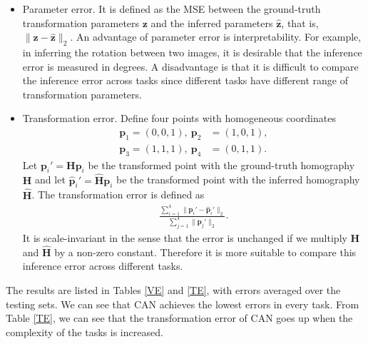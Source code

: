 \documentclass[conference]{IEEEtran}
\begin{document}
\vspace{0.1in}
\begin{itemize}
\item Parameter error. It is defined as the MSE between the ground-truth transformation parameters $\mathbf{z}$ and the inferred parameters $\widehat{\mathbf{z}}$, that is,  $\| \mathbf{z} - \widehat{\mathbf{z}}\|_2$. An advantage of parameter error is interpretability. For example, in inferring the rotation between two images, it is desirable that the inference error is measured in degrees. A disadvantage is that it is difficult to compare the inference error across tasks since different tasks have different range of transformation parameters.

\vspace{0.1in}
\item Transformation error. Define four points with homogeneous coordinates
\begin{align*}
\mathbf{p}_1 = (0,0,1),\  \mathbf{p}_2 &= (1,0,1), \\ 
\mathbf{p}_3 = (1,1,1),\  \mathbf{p}_4 &= (0,1,1).
\end{align*}
Let 
$\mathbf{p}_i' = \mathbf{Hp}_i$ be the transformed point with the ground-truth homography $\mathbf{H}$ and let $\widehat{\mathbf{p}}_i' = \widehat{\mathbf{H}}\mathbf{p}_i$ be the transformed point with the inferred homography $\widehat{\mathbf{H}}$. The transformation error is defined as 
\begin{align}
\frac{\sum_{i=1}^4 \|\mathbf{p}_i' - \widehat{\mathbf{p}}_i'\|_2}{\sum_{j=1}^4\|\mathbf{p}_j'\|_2}.
\end{align}
It is scale-invariant in the sense that the error is unchanged if we multiply $\mathbf{H}$ and $\widehat{\mathbf{H}}$ by a non-zero constant. Therefore it is more suitable to compare this inference error across different tasks.
\end{itemize}
\vspace{0.1in}



The results are listed in Tables \ref{VE} and \ref{TE}, with errors averaged over the testing sets. We can see that CAN achieves the lowest errors in every task. From Table \ref{TE}, we can see that the transformation error of CAN goes up when the complexity of the tasks is increased.
\end{document}
